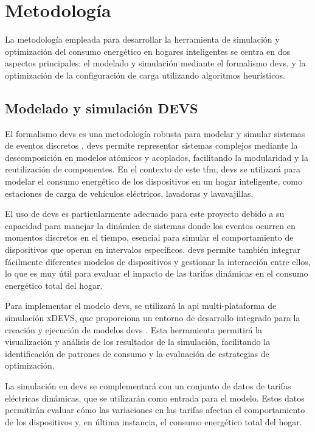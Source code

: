 \documentclass[11pt,a4paper]{book}
\begin{document}
\section{Metodología}

La metodología empleada para desarrollar la herramienta de simulación y optimización del consumo energético en hogares inteligentes se centra en dos aspectos principales: el modelado y simulación mediante el formalismo \gls{devs}, y la optimización de la configuración de carga utilizando algoritmos heurísticos.

\subsection{Modelado y simulación DEVS}

El formalismo \gls{devs} es una metodología robusta para modelar y simular sistemas de eventos discretos \cite{Zeigler2018}. \gls{devs} permite representar sistemas complejos mediante la descomposición en modelos atómicos y acoplados, facilitando la modularidad y la reutilización de componentes. En el contexto de este \gls{tfm}, \gls{devs} se utilizará para modelar el consumo energético de los dispositivos en un hogar inteligente, como estaciones de carga de vehículos eléctricos, lavadoras y lavavajillas.

El uso de \gls{devs} es particularmente adecuado para este proyecto debido a su capacidad para manejar la dinámica de sistemas donde los eventos ocurren en momentos discretos en el tiempo, esencial para simular el comportamiento de dispositivos que operan en intervalos específicos. \gls{devs} permite también integrar fácilmente diferentes modelos de dispositivos y gestionar la interacción entre ellos, lo que es muy útil para evaluar el impacto de las tarifas dinámicas en el consumo energético total del hogar.

Para implementar el modelo \gls{devs}, se utilizará la \gls{api} multi-plataforma de simulación xDEVS, que proporciona un entorno de desarrollo integrado para la creación y ejecución de modelos \gls{devs} \cite{RiscoMartin2023}. Esta herramienta permitirá la visualización y análisis de los resultados de la simulación, facilitando la identificación de patrones de consumo y la evaluación de estrategias de optimización.

La simulación en \gls{devs} se complementará con un conjunto de datos de tarifas eléctricas dinámicas, que se utilizarán como entrada para el modelo. Estos datos permitirán evaluar cómo las variaciones en las tarifas afectan el comportamiento de los dispositivos y, en última instancia, el consumo energético total del hogar.
\end{document}

